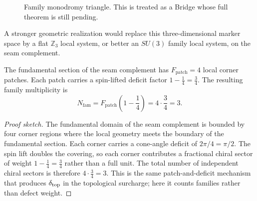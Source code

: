 \begin{figure}[t]
\centering
{}
\caption{Family monodromy triangle. This is treated as a Bridge whose full theorem is still pending.}
\label{fig:family-triangle}
\end{figure}

A stronger geometric realization would replace this three-dimensional marker space by a flat $\mathbb Z_3$ local system, or better an $SU(3)$ family local system, on the seam complement.

\begin{proposition}
The fundamental section of the seam complement has $F_{\mathrm{patch}}=4$ local corner patches. Each patch carries a spin-lifted deficit factor $1-\frac14=\frac34$. The resulting family multiplicity is
\begin{equation}
\label{eq:family-patch-deficit}
N_{\mathrm{fam}}=F_{\mathrm{patch}}\!\left(1-\frac14\right)=4\cdot\frac34=3.
\end{equation}
\end{proposition}

\begin{proof}[Proof sketch]
The fundamental domain of the seam complement is bounded by four corner regions where the local geometry meets the boundary of the fundamental section. Each corner carries a cone-angle deficit of $2\pi/4=\pi/2$. The spin lift doubles the covering, so each corner contributes a fractional chiral sector of weight $1-\frac{1}{4}=\frac{3}{4}$ rather than a full unit. The total number of independent chiral sectors is therefore $4\cdot\frac{3}{4}=3$. This is the same patch-and-deficit mechanism that produces $\delta_{\mathrm{top}}$ in the topological surcharge; here it counts families rather than defect weight.
\end{proof}

